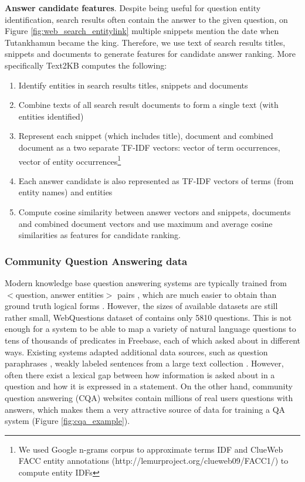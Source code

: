 \textbf{Answer candidate features}.
Despite being useful for question entity identification, search results often contain the answer to the given question, \eg on Figure \ref{fig:web_search_entitylink} multiple snippets mention the date when Tutankhamun became the king.
Therefore, we use text of search results titles, snippets and documents to generate features for candidate answer ranking.
More specifically Text2KB computes the following:
\begin{enumerate}
\item Identify entities in search results titles, snippets and documents
\item Combine texts of all search result documents to form a single text (with entities identified)
\item Represent each snippet (which includes title), document and combined document as a two separate TF-IDF vectors: vector of term occurrences, vector of entity occurrences\footnote{We used Google n-grams corpus to approximate terms IDF and ClueWeb FACC entity annotations (http://lemurproject.org/clueweb09/FACC1/) to compute entity IDFs}
\item Each answer candidate is also represented as TF-IDF vectors of terms (from entity names) and entities
\item Compute cosine similarity between answer vectors and snippets, documents and combined document vectors and use maximum and average cosine similarities as features for candidate ranking.
\end{enumerate}

\subsubsection{Community Question Answering data}
\label{section:method:cqa}

Modern knowledge base question answering systems are typically trained from $<$question, answer entities$>$ pairs \cite{Berant:EMNLP13}, which are much easier to obtain than ground truth logical forms \cite{cai2013large}.
However, the sizes of available datasets are still rather small, \ie WebQuestions dataset of \cite{Berant:EMNLP13} contains only 5810 questions.
This is not enough for a system to be able to map a variety of natural language questions to tens of thousands of predicates in Freebase, each of which asked about in different ways.
Existing systems adapted additional data sources, such as question paraphrases \cite{berant2014semantic}, weakly labeled sentences from a large text collection \cite{yao2014information}.
However, often there exist a lexical gap between how information is asked about in a question and how it is expressed in a statement.
On the other hand, community question answering (CQA) websites contain millions of real users questions with answers, which makes them a very attractive source of data for training a QA system (\eg Figure \ref{fig:cqa_example}).

